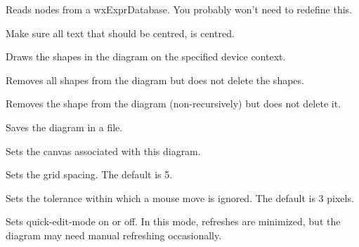 
Reads nodes from a wxExprDatabase. You probably won't need to redefine this.



Make sure all text that should be centred, is centred.



Draws the shapes in the diagram on the specified device context.



Removes all shapes from the diagram but does not delete the shapes.



Removes the shape from the diagram (non-recursively) but does not delete it.



Saves the diagram in a file.

\label{wxdiagramsetcanvas}


Sets the canvas associated with this diagram.



Sets the grid spacing. The default is 5.



Sets the tolerance within which a mouse move is ignored. The default is 3 pixels.



Sets quick-edit-mode on or off. In this mode, refreshes are minimized, but the
diagram may need manual refreshing occasionally.

